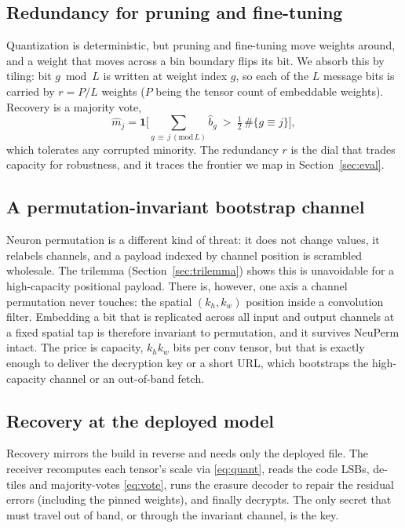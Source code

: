 \documentclass[10pt,journal]{IEEEtran}
\theoremstyle{remark}
\begin{document}
\subsection{Redundancy for pruning and fine-tuning}\label{sec:redund}
Quantization is deterministic, but pruning and fine-tuning move weights around, and a
weight that moves across a bin boundary flips its bit. We absorb this by tiling: bit
$g \bmod L$ is written at weight index $g$, so each of the $L$ message bits is carried
by $r=P/L$ weights ($P$ being the tensor count of embeddable weights). Recovery is a
majority vote,
\begin{equation}\label{eq:vote}
\hat m_j=\mathbf 1\!\Big[\textstyle\sum_{g\,\equiv\, j\,(\mathrm{mod}\,L)} \hat b_g
\ >\ \tfrac12\,\#\{g\equiv j\}\Big],
\end{equation}
which tolerates any corrupted minority. The redundancy $r$ is the dial that trades
capacity for robustness, and it traces the frontier we map in Section~\ref{sec:eval}.

\subsection{A permutation-invariant bootstrap channel}
Neuron permutation is a different kind of threat: it does not change values, it
relabels channels, and a payload indexed by channel position is scrambled wholesale.
The trilemma (Section~\ref{sec:trilemma}) shows this is unavoidable for a high-capacity
positional payload. There is, however, one axis a channel permutation never touches:
the spatial $(k_h,k_w)$ position inside a convolution filter. Embedding a bit that is
replicated across all input and output channels at a fixed spatial tap is therefore
invariant to permutation, and it survives NeuPerm intact. The price is capacity,
$k_h k_w$ bits per conv tensor, but that is exactly enough to deliver the decryption
key or a short URL, which bootstraps the high-capacity channel or an out-of-band fetch.

\subsection{Recovery at the deployed model}
Recovery mirrors the build in reverse and needs only the deployed file. The receiver
recomputes each tensor's scale via \eqref{eq:quant}, reads the code LSBs, de-tiles and
majority-votes \eqref{eq:vote}, runs the erasure decoder to repair the residual errors
(including the pinned weights), and finally decrypts. The only secret that must travel
out of band, or through the invariant channel, is the key.
\end{document}
